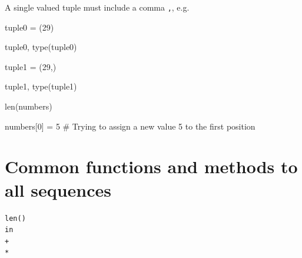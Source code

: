 \documentclass[
  letterpaper,
  DIV=11,
  numbers=noendperiod]{scrreprt}
\newenvironment{Shaded}{\begin{snugshade}}{\end{snugshade}}
\newcommand{\BuiltInTok}[1]{\textcolor[rgb]{0.00,0.23,0.31}{#1}}
\newcommand{\CommentTok}[1]{\textcolor[rgb]{0.37,0.37,0.37}{#1}}
\newcommand{\DecValTok}[1]{\textcolor[rgb]{0.68,0.00,0.00}{#1}}
\newcommand{\NormalTok}[1]{\textcolor[rgb]{0.00,0.23,0.31}{#1}}
\newcommand{\OperatorTok}[1]{\textcolor[rgb]{0.37,0.37,0.37}{#1}}
\begin{document}
A single valued tuple must include a comma \texttt{,}, e.g.

\begin{Shaded}
\begin{Highlighting}[]
\NormalTok{tuple0 }\OperatorTok{=}\NormalTok{ (}\DecValTok{29}\NormalTok{)}
\end{Highlighting}
\end{Shaded}

\begin{Shaded}
\begin{Highlighting}[]
\NormalTok{tuple0, }\BuiltInTok{type}\NormalTok{(tuple0)}
\end{Highlighting}
\end{Shaded}

\begin{Shaded}
\begin{Highlighting}[]
\NormalTok{tuple1 }\OperatorTok{=}\NormalTok{ (}\DecValTok{29}\NormalTok{,)}
\end{Highlighting}
\end{Shaded}

\begin{Shaded}
\begin{Highlighting}[]
\NormalTok{tuple1, }\BuiltInTok{type}\NormalTok{(tuple1)}
\end{Highlighting}
\end{Shaded}

\begin{Shaded}
\begin{Highlighting}[]
\BuiltInTok{len}\NormalTok{(numbers)}
\end{Highlighting}
\end{Shaded}

\begin{Shaded}
\begin{Highlighting}[]
\NormalTok{numbers[}\DecValTok{0}\NormalTok{] }\OperatorTok{=} \DecValTok{5} \CommentTok{\# Trying to assign a new value 5 to the first position}
\end{Highlighting}
\end{Shaded}

\hypertarget{common-functions-and-methods-to-all-sequences}{%
\chapter{Common functions and methods to all
sequences}\label{common-functions-and-methods-to-all-sequences}}

\begin{verbatim}
len()
in
+ 
*
\end{verbatim}
\end{document}
